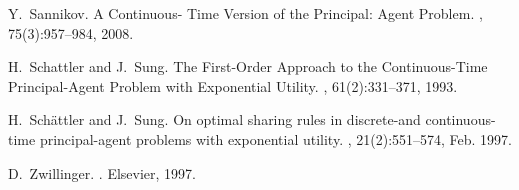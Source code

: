 \documentclass[numbook, envcountsect, envcountsame, envcountreset, runningheads, smallextended]{article}
\begin{document}
\begin{thebibliography}{1}
Y.~Sannikov.
\newblock A {Continuous}- {Time} {Version} of the {Principal}: {Agent}
  {Problem}.
, 75(3):957--984, 2008.



H.~Schattler and J.~Sung.
\newblock The {First}-{Order} {Approach} to the {Continuous}-{Time}
  {Principal}-{Agent} {Problem} with {Exponential} {Utility}.
, 61(2):331--371, 1993.

H.~Schättler and J.~Sung.
\newblock On optimal sharing rules in discrete-and continuous-time
  principal-agent problems with exponential utility.
, 21(2):551--574, Feb.
  1997.
  
  
%

D.~Zwillinger.
.
\newblock Elsevier, 1997.


\end{thebibliography}
\end{document}
